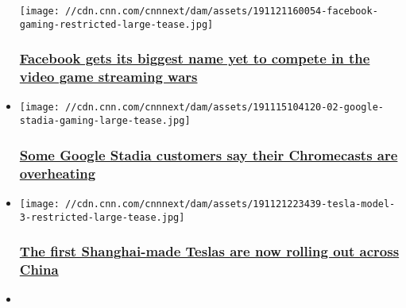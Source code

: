 \begin{itemize}
  \texttt{[image: //cdn.cnn.com/cnnnext/dam/assets/191121160054-facebook-gaming-restricted-large-tease.jpg]}

  \hypertarget{facebook-gets-its-biggest-name-yet-to-compete-in-the-video-game-streaming-wars}{%
  \subsubsection{\texorpdfstring{\href{/2019/11/22/tech/facebook-gaming-disguised-toast/index.html}{Facebook
  gets its biggest name yet to compete in the video game streaming
  wars}}{Facebook gets its biggest name yet to compete in the video game streaming wars}}\label{facebook-gets-its-biggest-name-yet-to-compete-in-the-video-game-streaming-wars}}
\item
  \href{/2019/11/22/tech/google-stadia-overheat-chromecast-trnd/index.html}{}

  \texttt{[image: //cdn.cnn.com/cnnnext/dam/assets/191115104120-02-google-stadia-gaming-large-tease.jpg]}

  \hypertarget{some-google-stadia-customers-say-their-chromecasts-are-overheating-}{%
  \subsubsection{\texorpdfstring{\href{/2019/11/22/tech/google-stadia-overheat-chromecast-trnd/index.html}{Some
  Google Stadia customers say their Chromecasts are overheating
  }}{Some Google Stadia customers say their Chromecasts are overheating }}\label{some-google-stadia-customers-say-their-chromecasts-are-overheating-}}
\item
  \href{/2019/11/21/tech/tesla-china-model-3-factory/index.html}{}

  \texttt{[image: //cdn.cnn.com/cnnnext/dam/assets/191121223439-tesla-model-3-restricted-large-tease.jpg]}

  \hypertarget{the-first-shanghai-made-teslas-are-now-rolling-out-across-china-}{%
  \subsubsection{\texorpdfstring{\href{/2019/11/21/tech/tesla-china-model-3-factory/index.html}{The
  first Shanghai-made Teslas are now rolling out across China
  }}{The first Shanghai-made Teslas are now rolling out across China }}\label{the-first-shanghai-made-teslas-are-now-rolling-out-across-china-}}
\item
  \href{/2019/11/21/tech/microsoft-surface-earbuds-airpods-rival-launch-delay/index.html}{}


\end{itemize}
